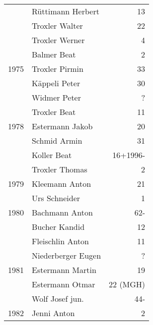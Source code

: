 {\begin{longtable}{ l l r }
                      & Rüttimann Herbert                         & 13          \\
                      & Troxler Walter                            & 22          \\
                      & Troxler Werner                            & 4           \\
                      & Balmer Beat                               & 2           \\
        1975          & Troxler Pirmin                            & 33          \\
                      & Käppeli Peter                             & 30          \\
                      & Widmer Peter                              & ?           \\
                      & Troxler Beat                              & 11          \\
        1978          & Estermann Jakob                           & 20          \\
                      & Schmid Armin                              & 31          \\
                      & Koller Beat                               & 16+1996-    \\
                      & Troxler Thomas                            & 2           \\
        1979          & Kleemann Anton                            & 21          \\
                      & Urs Schneider                             & 1           \\
        1980          & Bachmann Anton                            & 62-         \\
                      & Bucher Kandid                             & 12          \\
                      & Fleischlin Anton                          & 11          \\
                      & Niederberger Eugen                        & ?           \\
        1981          & Estermann Martin                          & 19          \\
                      & Estermann Otmar                           & 22 (MGH)    \\
                      & Wolf Josef jun.                           & 44-         \\
        1982          & Jenni Anton                               & 2           \\

\end{longtable}}
